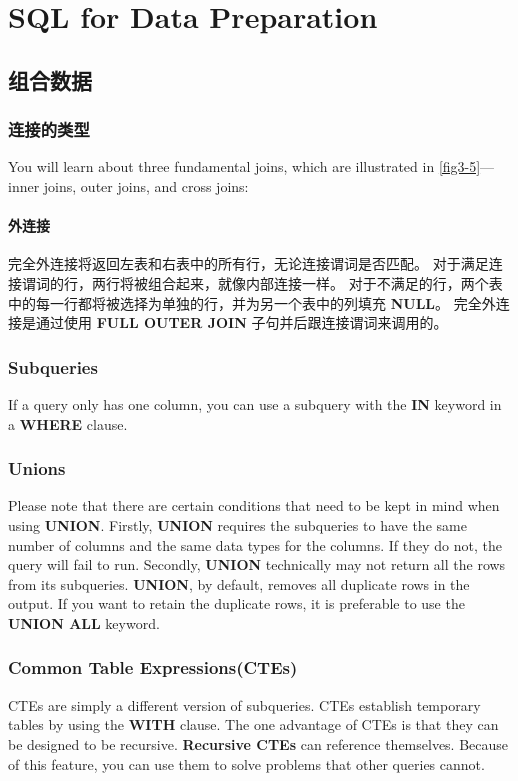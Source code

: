 \chapter{SQL for Data Preparation\label{Ch03}}
\section{组合数据}
\subsection{连接的类型}
You will learn about three fundamental joins, which are illustrated in \autoref{fig3-5}—inner joins, outer joins, and cross joins:

\subsubsection*{外连接}
完全外连接将返回左表和右表中的所有行，无论连接谓词是否匹配。 对于满足连接谓词的行，两行将被组合起来，就像内部连接一样。 对于不满足的行，两个表中的每一行都将被选择为单独的行，并为另一个表中的列填充 \textbf{NULL}。 完全外连接是通过使用 \textbf{FULL OUTER JOIN} 子句并后跟连接谓词来调用的。
\subsection{Subqueries}
If a query only has one column, you can use a subquery with the \textbf{IN} keyword in a \textbf{WHERE} clause.

\subsection{Unions}
Please note that there are certain conditions that need to be kept in mind when using \textbf{UNION}. Firstly, \textbf{UNION} requires the subqueries to have the same number of columns and the same data types for the columns. If they do not, the query will fail to run. Secondly, \textbf{UNION} technically may not return all the rows from its subqueries. \textbf{UNION}, by default, removes all duplicate rows in the output. If you want to retain the duplicate rows, it is preferable to use the \textbf{UNION ALL} keyword.

\subsection{Common Table Expressions(CTEs)}
CTEs are simply a different version of subqueries. CTEs establish temporary tables by using the \textbf{WITH} clause. The one advantage of CTEs is that they can be designed to be recursive. \textbf{Recursive CTEs} can reference themselves. Because of this feature, you can use them to solve problems that other queries cannot.

